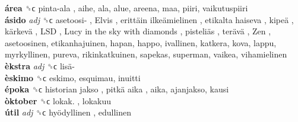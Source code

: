 \textbf{área} ␝ϲ   pinta-ala , aihe, ala, alue, areena, maa, piiri, vaikutuspiiri  \\
\textbf{ásido} \emph{adj}  ␝ϲ   asetoosi- ,  Elvis ,  erittäin ilkeämielinen ,  etikalta haiseva ,  kipeä ,  kärkevä ,  LSD ,  Lucy in the sky with diamonds ,  pisteliäs ,  terävä ,  Zen , asetoosinen, etikanhajuinen, hapan, happo, ivallinen, katkera, kova, lappu, myrkyllinen, pureva, rikinkatkuinen, sapekas, superman, vaikea, vihamielinen  \\
\textbf{èkstra} \emph{adj}  ␝ϲ   lisä-   \\
\textbf{èskimo} ␝ϲ  eskimo, esquimau, inuitti  \\
\textbf{époka} ␝ϲ   historian jakso ,  pitkä aika , aika, ajanjakso, kausi  \\
\textbf{òktober} ␝ϲ   lokak. , lokakuu  \\
\textbf{útil} \emph{adj}  ␝ϲ   hyödyllinen , edullinen  \\
